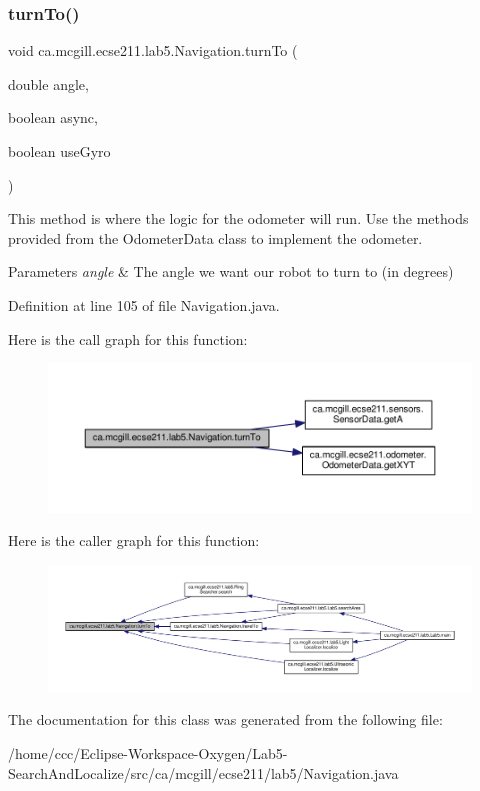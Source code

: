 \subsubsection{\texorpdfstring{turn\+To()}{turnTo()}}
{\footnotesize\ttfamily void ca.\+mcgill.\+ecse211.\+lab5.\+Navigation.\+turn\+To (\begin{DoxyParamCaption}\item[{double}]{angle,  }\item[{boolean}]{async,  }\item[{boolean}]{use\+Gyro }\end{DoxyParamCaption})}

This method is where the logic for the odometer will run. Use the methods provided from the Odometer\+Data class to implement the odometer.


\begin{DoxyParams}{Parameters}
{\em angle} & The angle we want our robot to turn to (in degrees) \\
\hline
\end{DoxyParams}


Definition at line 105 of file Navigation.\+java.

Here is the call graph for this function\+:
\nopagebreak
\begin{figure}[H]
\begin{center}
\leavevmode
\includegraphics[width=350pt]{classca_1_1mcgill_1_1ecse211_1_1lab5_1_1_navigation_ac2c358ea3663ac06fcf757628a4a4a31_cgraph}
\end{center}
\end{figure}
Here is the caller graph for this function\+:
\nopagebreak
\begin{figure}[H]
\begin{center}
\leavevmode
\includegraphics[width=350pt]{classca_1_1mcgill_1_1ecse211_1_1lab5_1_1_navigation_ac2c358ea3663ac06fcf757628a4a4a31_icgraph}
\end{center}
\end{figure}


The documentation for this class was generated from the following file\+:\begin{DoxyCompactItemize}
\item 
/home/ccc/\+Eclipse-\/\+Workspace-\/\+Oxygen/\+Lab5-\/\+Search\+And\+Localize/src/ca/mcgill/ecse211/lab5/Navigation.\+java\end{DoxyCompactItemize}
